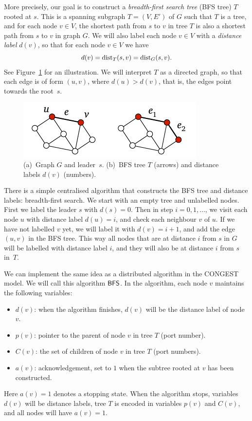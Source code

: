 More precisely, our goal is to construct a \emph{breadth-first search tree} (BFS tree) $T$ rooted at $s$. This is a spanning subgraph $T = (V,E')$ of $G$ such that $T$ is a tree, and for each node $v \in V$, the shortest path from $s$ to $v$ in tree $T$ is also a shortest path from $s$ to $v$ in graph $G$. We will also label each node $v \in V$ with a \emph{distance label} $d(v)$, so that for each node $v \in V$ we have
\[
    d(v) = \operatorname{dist}_T(s,v) = \operatorname{dist}_G(s,v).
\]
See Figure~\ref{fig:bfs} for an illustration. We will interpret $T$ as a directed graph, so that each edge is of form $(u,v)$, where $d(u) > d(v)$, that is, the edges point towards the root~$s$.

\begin{figure}
    \centering
    \includegraphics[page=\PBFS]{figs.pdf}
    \caption{(a)~Graph $G$ and leader~$s$. (b)~BFS tree $T$ (arrows) and distance labels $d(v)$ (numbers).}\label{fig:bfs}
\end{figure}

There is a simple centralised algorithm that constructs the BFS tree and distance labels: breadth-first search. We start with an empty tree and unlabelled nodes. First we label the leader $s$ with $d(s) = 0$. Then in step $i = 0, 1, \dotsc$, we visit each node $u$ with distance label $d(u) = i$, and check each neighbour $v$ of $u$. If we have not labelled $v$ yet, we will label it with $d(v) = i+1$, and add the edge $(u,v)$ in the BFS tree. This way all nodes that are at distance $i$ from $s$ in $G$ will be labelled with distance label $i$, and they will also be at distance $i$ from $s$ in~$T$.

We can implement the same idea as a distributed algorithm in the CONGEST model. We will call this algorithm $\textup{\sffamily BFS}$. In the algorithm, each node $v$ maintains the following variables:
\begin{itemize}
    \item $d(v)$: when the algorithm finishes, $d(v)$ will be the distance label of node $v$.
    \item $p(v)$: pointer to the parent of node $v$ in tree $T$ (port number).
    \item $C(v)$: the set of children of node $v$ in tree $T$ (port numbers).
    \item $a(v)$: acknowledgement, set to $1$ when the subtree rooted at $v$ has been constructed.
\end{itemize}
Here $a(v) = 1$ denotes a stopping state. When the algorithm stops, variables $d(v)$ will be distance labels, tree $T$ is encoded in variables $p(v)$ and $C(v)$, and all nodes will have $a(v) = 1$.

